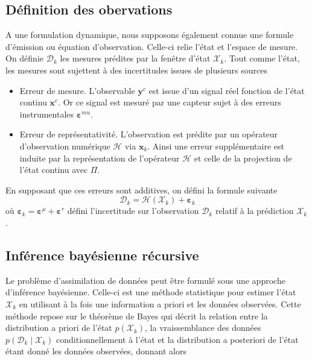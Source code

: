 \subsection{Définition des obervations}
A une formulation dynamique, nous supposons également connue une formule d'émission ou équation d'observation. Celle-ci relie l'état et l'espace de mesure. On définie $\mathcal{D}_k$ les mesures prédites par la fenêtre d'état $\mathcal{X}_k$. Tout comme l'état, les mesures sont sujettent à des incertitudes issues de plusieurs sources

\begin{itemize}
    \item Erreur de mesure. L'observable $\bm y^c$ est issue d'un signal réel fonction de l'état continu $\bm x^c$. Or ce signal est mesuré par une capteur sujet à des erreurs instrumentales $\bm \varepsilon^{mu}$.
    \item Erreur de représentativité. L'observation est prédite par un opérateur d'observation numérique $\mathcal H$ via $\bm x_k$. Ainsi une erreur supplémentaire est induite par la représentation de l'opérateur $\mathcal H$ et celle de la projection de l'état continu avec $\Pi$.
\end{itemize}

En supposant que ces erreurs sont additives, on défini la formule suivante
\begin{equation*}
    \mathcal D_k = \mathcal H (\mathcal{X}_k) + \bm{\varepsilon}_k
\end{equation*} où $\bm{\varepsilon}_k = \bm{\varepsilon}^\mu  + \bm{\varepsilon}^r$ défini l'incertitude sur l'observation $\mathcal D_k$ relatif à la prédiction $\mathcal{X}_k$.

\subsection{Inférence bayésienne récursive}

Le problème d'assimilation de données peut être formulé sous une approche d'inférence bayésienne. Celle-ci est une méthode statistique pour estimer l'état $\mathcal X_k$ en utilisant à la fois une information a priori et les données observées. Cette méthode repose sur le théorème de Bayes qui décrit la relation entre la distribution a priori de l'état $p(\mathcal X_k)$, la vraissemblance des données $p(\mathcal D_k \mid \mathcal X_k)$ conditionnellement à l'état et la distribution a posteriori de l'état étant donné les données observées, donnant alors

